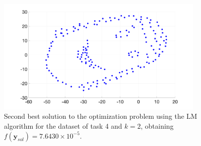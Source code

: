 \documentclass[12pt]{article}
\begin{document}
\begin{figure}[ht!]
	\centering
	\includegraphics[width=0.9\textwidth]{figures/task4_sol_2.png}
	\caption{Second best solution to the optimization problem using the LM algorithm for the dataset of task 4 and $k=2$, obtaining $f(\mathbf{y}_{sol}) = 7.6430\times 10^{-5}$.}
	\label{fig:task4_sol_2}
\end{figure}
\end{document}
